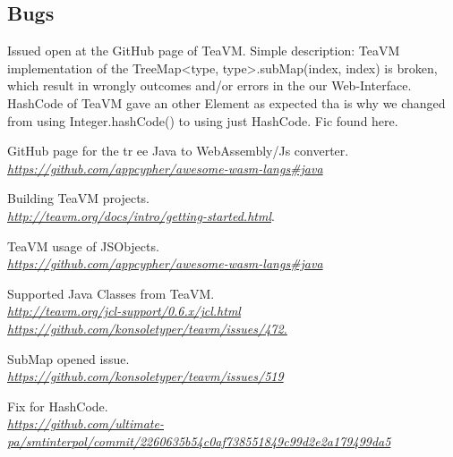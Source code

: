 \documentclass[]{article}
\begin{document}
\subsection{Bugs}
Issued open at the GitHub page\cite{5} of TeaVM. Simple description: TeaVM implementation of the TreeMap<type, type>.subMap(index, index) is broken, which result in wrongly outcomes and/or errors in the our Web-Interface. \\

HashCode of TeaVM gave an other Element as expected tha is why we changed from using Integer.hashCode() to using just HashCode. Fic found here. \cite{6}

\medskip

\begin{thebibliography}{9}
GitHub page for the tr	ee Java to WebAssembly/Js converter. 
\\\textit{\href{https://github.com/appcypher/awesome-wasm-langs\#java}{https://github.com/appcypher/awesome-wasm-langs\#java}}

Building TeaVM projects. 
\\\textit{\href{http://teavm.org/docs/intro/getting-started.html}{http://teavm.org/docs/intro/getting-started.html}}.

TeaVM usage of JSObjects.
\\\textit{\href{https://github.com/appcypher/awesome-wasm-langs\#java}{https://github.com/appcypher/awesome-wasm-langs\#java}}

Supported Java Classes from TeaVM.
\\\textit{\href{http://teavm.org/jcl-support/0.6.x/jcl.html}{ http://teavm.org/jcl-support/0.6.x/jcl.html} \\ \href{https://github.com/konsoletyper/teavm/issues/472}{ https://github.com/konsoletyper/teavm/issues/472.}}

SubMap opened issue.
\\\textit{\href{https://github.com/konsoletyper/teavm/issues/519}{https://github.com/konsoletyper/teavm/issues/519}}

Fix for HashCode.
\\\textit{\href{https://github.com/ultimate-pa/smtinterpol/commit/2260635b54c0af738551849c99d2e2a179499da5}{https://github.com/ultimate-pa/smtinterpol/commit/2260635b54c0af738551849c99d2e2a179499da5}}

\end{thebibliography}
\end{document}
